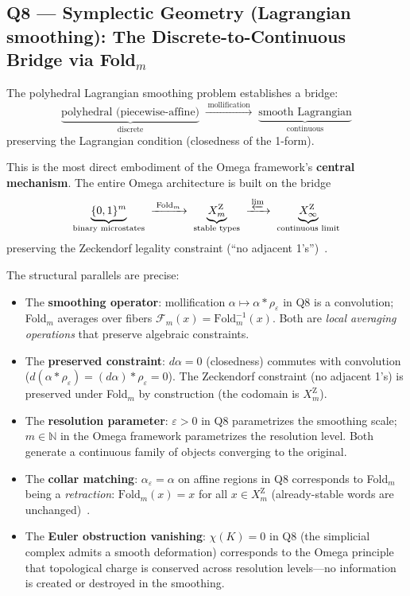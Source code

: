 \subsection{Q8 --- Symplectic Geometry (Lagrangian smoothing):
  The Discrete-to-Continuous Bridge via Fold$_m$}
\label{ss:omega-q8}

\begin{remark}
The polyhedral Lagrangian smoothing problem establishes a bridge:
\[
\underbrace{\text{polyhedral (piecewise-affine)}}_{\text{discrete}}
\;\xrightarrow{\;\text{mollification}\;}\;
\underbrace{\text{smooth Lagrangian}}_{\text{continuous}}
\]
preserving the Lagrangian condition (closedness of the 1-form).

This is the most direct embodiment of the Omega framework's
\textbf{central mechanism}.  The entire Omega architecture is built
on the bridge
\[
\underbrace{\{0,1\}^m}_{\text{binary microstates}}
\;\xrightarrow{\;\mathrm{Fold}_m\;}\;
\underbrace{X_m^{\mathrm Z}}_{\text{stable types}}
\;\xrightarrow{\;\varprojlim\;}\;
\underbrace{X_\infty^{\mathrm Z}}_{\text{continuous limit}}
\]
preserving the Zeckendorf legality constraint
(``no adjacent 1's'')~\cite{omega-fop}.

The structural parallels are precise:
\begin{itemize}[nosep]
\item The \textbf{smoothing operator}: mollification
  $\alpha\mapsto\alpha\ast\rho_\varepsilon$ in Q8 is a convolution;
  Fold$_m$ averages over fibers $\mathcal F_m(x)=\mathrm{Fold}_m^{-1}(x)$.
  Both are \emph{local averaging operations} that preserve algebraic
  constraints.
\item The \textbf{preserved constraint}: $d\alpha=0$ (closedness)
  commutes with convolution ($d(\alpha\ast\rho_\varepsilon)
  =(d\alpha)\ast\rho_\varepsilon=0$).
  The Zeckendorf constraint (no adjacent 1's) is preserved under
  Fold$_m$ by construction (the codomain is $X_m^{\mathrm Z}$).
\item The \textbf{resolution parameter}: $\varepsilon>0$
  in Q8 parametrizes the smoothing scale; $m\in\mathbb N$ in
  the Omega framework parametrizes the resolution level.
  Both generate a continuous family of objects converging to
  the original.
\item The \textbf{collar matching}: $\alpha_\varepsilon=\alpha$ on
  affine regions in Q8 corresponds to Fold$_m$ being a
  \emph{retraction}: $\mathrm{Fold}_m(x)=x$ for all
  $x\in X_m^{\mathrm Z}$ (already-stable words are
  unchanged)~\cite{omega-fop}.
\item The \textbf{Euler obstruction vanishing}: $\chi(K)=0$ in Q8
  (the simplicial complex admits a smooth deformation) corresponds
  to the Omega principle that topological charge is conserved
  across resolution levels---no information is created or destroyed
  in the smoothing.
\end{itemize}


\end{remark}
